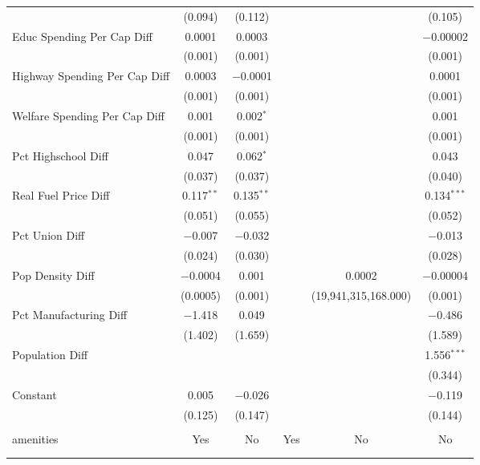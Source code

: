 \begin{table}[!htbp]
\begin{tabular}{@{\extracolsep{5pt}}lccccc}
  & (0.094) & (0.112) &  &  & (0.105) \\ 
  Educ Spending Per Cap Diff & 0.0001 & 0.0003 &  &  & $-$0.00002 \\ 
  & (0.001) & (0.001) &  &  & (0.001) \\ 
  Highway Spending Per Cap Diff & 0.0003 & $-$0.0001 &  &  & 0.0001 \\ 
  & (0.001) & (0.001) &  &  & (0.001) \\ 
  Welfare Spending Per Cap Diff & 0.001 & 0.002$^{*}$ &  &  & 0.001 \\ 
  & (0.001) & (0.001) &  &  & (0.001) \\ 
  Pct Highschool Diff & 0.047 & 0.062$^{*}$ &  &  & 0.043 \\ 
  & (0.037) & (0.037) &  &  & (0.040) \\ 
  Real Fuel Price Diff & 0.117$^{**}$ & 0.135$^{**}$ &  &  & 0.134$^{***}$ \\ 
  & (0.051) & (0.055) &  &  & (0.052) \\ 
  Pct Union Diff & $-$0.007 & $-$0.032 &  &  & $-$0.013 \\ 
  & (0.024) & (0.030) &  &  & (0.028) \\ 
  Pop Density Diff & $-$0.0004 & 0.001 &  & 0.0002 & $-$0.00004 \\ 
  & (0.0005) & (0.001) &  & (19,941,315,168.000) & (0.001) \\ 
  Pct Manufacturing Diff & $-$1.418 & 0.049 &  &  & $-$0.486 \\ 
  & (1.402) & (1.659) &  &  & (1.589) \\ 
  Population Diff &  &  &  &  & 1.556$^{***}$ \\ 
  &  &  &  &  & (0.344) \\ 
  Constant & 0.005 & $-$0.026 &  &  & $-$0.119 \\ 
  & (0.125) & (0.147) &  &  & (0.144) \\ 
 \hline \\[-1.8ex] 
amenities & Yes & No & Yes & No & No \\ 
\hline \\[-1.8ex] 
\hline 
\hline \\[-1.8ex] 
\end{tabular} 
\end{table} 

